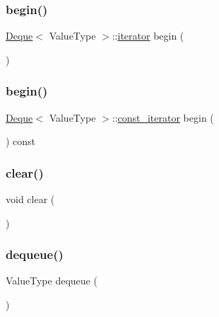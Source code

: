 \mbox{\label{classDeque_a9401c74ac7945b9ef845456a094e3aa5}} 
\subsubsection{\texorpdfstring{begin()}{begin()}\hspace{0.1cm}{\footnotesize\ttfamily [1/2]}}
{\footnotesize\ttfamily \mbox{\hyperlink{classDeque}{Deque}}$<$ Value\+Type $>$\+::\mbox{\hyperlink{classDeque_af87a5290666b1bb4bf3e44cafc305ad5}{iterator}} begin (\begin{DoxyParamCaption}{ }\end{DoxyParamCaption})}

\mbox{\label{classDeque_a6d7df88b97979181d0b076ffffa253cc}} 
\subsubsection{\texorpdfstring{begin()}{begin()}\hspace{0.1cm}{\footnotesize\ttfamily [2/2]}}
{\footnotesize\ttfamily \mbox{\hyperlink{classDeque}{Deque}}$<$ Value\+Type $>$\+::\mbox{\hyperlink{classDeque_a82e5b35971ca4096ad8c03687e86f11f}{const\+\_\+iterator}} begin (\begin{DoxyParamCaption}{ }\end{DoxyParamCaption}) const}

\mbox{\label{classDeque_ac8bb3912a3ce86b15842e79d0b421204}} 
\subsubsection{\texorpdfstring{clear()}{clear()}}
{\footnotesize\ttfamily void clear (\begin{DoxyParamCaption}{ }\end{DoxyParamCaption})}

\mbox{\label{classDeque_aaee07e371e2370e76e6c42bada727ba2}} 
\subsubsection{\texorpdfstring{dequeue()}{dequeue()}}
{\footnotesize\ttfamily Value\+Type dequeue (\begin{DoxyParamCaption}{ }\end{DoxyParamCaption})}

